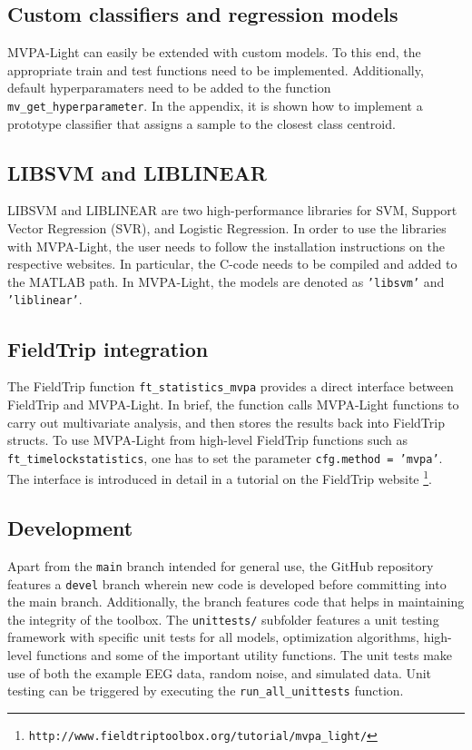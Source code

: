 \documentclass[utf8]{frontiersSCNS} %
\newcommand{\ttt}[1]{\texttt{#1}}
\begin{document}
\subsection{Custom classifiers and regression models}

MVPA-Light can easily be extended with custom models. To this end, the appropriate train and test functions need to be implemented. Additionally, default hyperparamaters need to be added to the function \ttt{mv\_get\_hyperparameter}. In the appendix, it is shown how to implement a prototype classifier that assigns a sample to the closest class centroid.

\subsection{LIBSVM and LIBLINEAR}\label{sec:libsvm}

LIBSVM \citep{Chang2011LIBSVM:Machines} and LIBLINEAR \citep{Fan2008} are two high-performance libraries for SVM, Support Vector Regression (SVR), and Logistic Regression. In order to use the libraries with MVPA-Light, the user needs to follow the installation instructions on the respective websites. In particular, the C-code needs to be compiled and added to the MATLAB path. In MVPA-Light, the models are denoted as \ttt{'libsvm'} and \ttt{'liblinear'}.

\subsection{FieldTrip integration}

The FieldTrip \citep{Oostenveld2011} function \ttt{ft\_statistics\_mvpa} provides a direct interface between FieldTrip and MVPA-Light. In brief, the function calls MVPA-Light functions to carry out multivariate analysis, and then stores the results back into FieldTrip structs. To use MVPA-Light from high-level FieldTrip functions such as \ttt{ft\_timelockstatistics}, one has to set the parameter \ttt{cfg.method = 'mvpa'}. The interface is introduced in detail in a tutorial on the FieldTrip website \footnote{\ttt{http://www.fieldtriptoolbox.org/tutorial/mvpa\_light/}}.

\subsection{Development}\label{sec:development}

Apart from the \ttt{main} branch intended for general use, the GitHub repository features a \ttt{devel} branch wherein new code is developed before committing into the main branch. Additionally, the branch features code that helps in maintaining the integrity of the toolbox. The \ttt{unittests/} subfolder features a unit testing framework with specific unit tests for all models, optimization algorithms, high-level functions and some of the important utility functions. The unit tests make use of both the example EEG data, random noise, and simulated data. Unit testing can be triggered by executing the \ttt{run\_all\_unittests} function.
\end{document}
